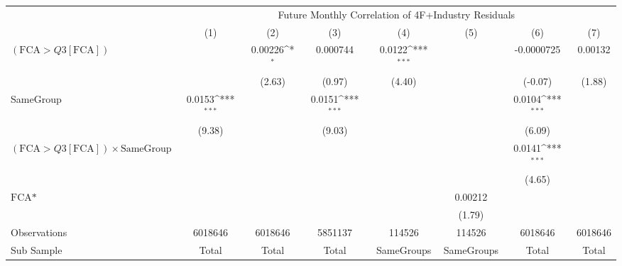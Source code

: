 {
\def\sym#1{\ifmmode^{#1}\else\(^{#1}\)\fi}
\begin{tabular}{l*{7}{c}}
\hline\hline
                &\multicolumn{7}{c}{Future Monthly Correlation of 4F+Industry Residuals}                                                             \\\cmidrule(lr){2-8}
                &\multicolumn{1}{c}{(1)}         &\multicolumn{1}{c}{(2)}         &\multicolumn{1}{c}{(3)}         &\multicolumn{1}{c}{(4)}         &\multicolumn{1}{c}{(5)}         &\multicolumn{1}{c}{(6)}         &\multicolumn{1}{c}{(7)}         \\
\hline
 $ (\text{FCA} > Q3[\text{FCA}]) $ &                  &  0.00226\sym{*}  & 0.000744         &   0.0122\sym{***}&                  &-0.0000725         &  0.00132         \\
                &                  &   (2.63)         &   (0.97)         &   (4.40)         &                  &  (-0.07)         &   (1.88)         \\
[1em]
SameGroup       &   0.0153\sym{***}&                  &   0.0151\sym{***}&                  &                  &   0.0104\sym{***}&                  \\
                &   (9.38)         &                  &   (9.03)         &                  &                  &   (6.09)         &                  \\
[1em]
 $ (\text{FCA} > Q3[\text{FCA}]) \times  {\text{SameGroup} }  $ &                  &                  &                  &                  &                  &   0.0141\sym{***}&                  \\
                &                  &                  &                  &                  &                  &   (4.65)         &                  \\
[1em]
$ \text{FCA*} $ &                  &                  &                  &                  &  0.00212         &                  &                  \\
                &                  &                  &                  &                  &   (1.79)         &                  &                  \\
\hline
Observations    &  6018646         &  6018646         &  5851137         &   114526         &   114526         &  6018646         &  6018646         \\
Sub Sample      &    Total         &    Total         &    Total         &SameGroups         &SameGroups         &    Total         &    Total         \\

\end{tabular}}
